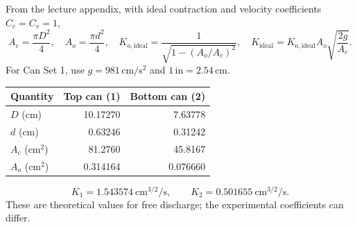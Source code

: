 \documentclass[name=Kushaal,title=TwoCanPrelab]{report}
\begin{document}
From the lecture appendix, with ideal contraction and velocity coefficients $C_c=C_v=1$,
\[
A_c=\frac{\pi D^2}{4},\quad A_o=\frac{\pi d^2}{4},\quad
K_{o,\mathrm{ideal}}=\frac{1}{\sqrt{1-(A_o/A_c)^2}},\quad
K_{\mathrm{ideal}}=K_{o,\mathrm{ideal}}A_o\sqrt{\frac{2g}{A_c}}.
\]
For Can Set 1, use $g=981\,\mathrm{cm/s^2}$ and $1\,\mathrm{in}=2.54\,\mathrm{cm}$.
\begin{center}
\begin{tabular}{lrr}\toprule
Quantity & Top can (1) & Bottom can (2)\\\midrule
$D$ (cm) & 10.17270 & 7.63778\\
$d$ (cm) & 0.63246 & 0.31242\\
$A_c$ (cm$^2$) & 81.2760 & 45.8167\\
$A_o$ (cm$^2$) & 0.314164 & 0.076660\\\bottomrule
\end{tabular}
\end{center}
\[
\boxed{K_1=1.543574\ \mathrm{cm^{3/2}/s}},\qquad
\boxed{K_2=0.501655\ \mathrm{cm^{3/2}/s}}.
\]
These are theoretical values for free discharge; the experimental coefficients can differ.
\end{document}

